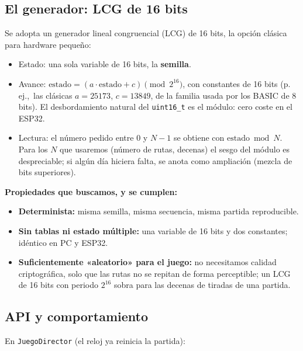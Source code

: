 \subsection{El generador: LCG de 16 bits}

Se adopta un generador lineal congruencial (LCG) de 16 bits, la opción
clásica para hardware pequeño:

\begin{itemize}
	\item Estado: una sola variable de 16 bits, la \textbf{semilla}.
	
	\item Avance: $\text{estado} = (a \cdot \text{estado} + c) \pmod{2^{16}}$,
	con constantes de 16 bits (p.\,ej.,\ las clásicas $a = 25173$,
	$c = 13849$, de la familia usada por los BASIC de 8 bits). El
	desbordamiento natural del \texttt{uint16\_t} es el módulo: cero
	coste en el ESP32.
	
	\item Lectura: el número pedido entre 0 y $N-1$ se obtiene con
	$\text{estado} \bmod N$. Para los $N$ que usaremos (número de rutas,
	decenas) el sesgo del módulo es despreciable; si algún día hiciera
	falta, se anota como ampliación (mezcla de bits superiores).
\end{itemize}

\textbf{Propiedades que buscamos, y se cumplen:}

\begin{itemize}
	\item \textbf{Determinista:} misma semilla, misma secuencia, misma partida
	reproducible.
	
	\item \textbf{Sin tablas ni estado múltiple:} una variable de 16 bits y dos
	constantes; idéntico en PC y ESP32.
	
	\item \textbf{Suficientemente «aleatorio» para el juego:} no necesitamos
	calidad criptográfica, solo que las rutas no se repitan de forma
	perceptible; un LCG de 16 bits con periodo $2^{16}$ sobra para las
	decenas de tiradas de una partida.
\end{itemize}

\subsection{API y comportamiento}

En \texttt{JuegoDirector} (el reloj ya reinicia la partida):

